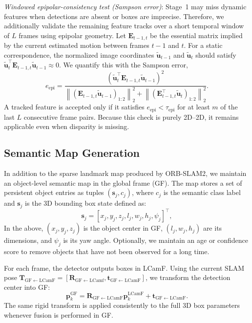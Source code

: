 \documentclass[letterpaper, 10 pt, conference]{IEEEtran}  %
\begin{document}
 {\it Windowed epipolar-consistency test (Sampson error)}:
Stage~1 may miss dynamic features when detections are absent or boxes are imprecise. Therefore, we additionally validate the remaining feature tracks over a short temporal window of $L$ frames using epipolar geometry. Let $\mathbf{E}_{t-1,t}$ be the essential matrix implied by the current estimated motion between frames $t-1$ and $t$. For a static correspondence, the normalized image coordinates $\tilde{\mathbf{u}}_{t-1}$ and $\tilde{\mathbf{u}}_{t}$ should satisfy $\tilde{\mathbf{u}}_t^\top \mathbf{E}_{t-1,t}\tilde{\mathbf{u}}_{t-1}\approx 0$. We quantify this with the Sampson error,
\begin{equation}
e_{\mathrm{epi}}=
\frac{\left(\tilde{\mathbf{u}}_t^\top \mathbf{E}_{t-1,t}\tilde{\mathbf{u}}_{t-1}\right)^2}
{\left\|(\mathbf{E}_{t-1,t}\tilde{\mathbf{u}}_{t-1})_{1:2}\right\|_2^2+\left\|(\mathbf{E}_{t-1,t}^\top\tilde{\mathbf{u}}_t)_{1:2}\right\|_2^2}.
\label{eq:sampson}
\end{equation}
A tracked feature is accepted only if it satisfies $e_{\mathrm{epi}}<\tau_{\mathrm{epi}}$ for at least $m$ of the last $L$ consecutive frame pairs. Because this check is purely 2D--2D, it remains applicable even when disparity is missing.
\subsection{Semantic Map Generation}
In addition to the sparse landmark map produced by ORB-SLAM2, we maintain an object-level semantic map in the global frame (GF).
The map stores a set of persistent object entries as tuples $(\mathbf{s}_j, c_j)$, where $c_j$ is the semantic class label and $\mathbf{s}_j$ is the 3D bounding box state defined as:
\begin{equation}
\mathbf{s}_j=[x_j,y_j,z_j,l_j,w_j,h_j,\psi_j]^\top,
\label{eq:obj_state}
\end{equation}
In the above, $(x_j,y_j,z_j)$ is the object center in GF, $(l_j,w_j,h_j)$ are its dimensions, and $\psi_j$ is its yaw angle. Optionally, we maintain an age or confidence score to remove objects that have not been observed for a long time.

For each frame, the detector outputs boxes in LCamF. Using the current SLAM pose $\mathbf{T}_{\mathrm{GF}\leftarrow\mathrm{LCamF}}=[\mathbf{R}_{\mathrm{GF}\leftarrow\mathrm{LCamf}},\mathbf{t}_{\mathrm{GF}\leftarrow\mathrm{LCamF}}]$, we transform the detection center into GF:
\begin{equation}
\mathbf{p}^{\mathrm{GF}}_k=\mathbf{R}_{\mathrm{GF}\leftarrow\mathrm{LCamF}}\mathbf{p}^{\mathrm{LCamF}}_k+\mathbf{t}_{\mathrm{GF}\leftarrow\mathrm{LCamF}}.
\label{eq:tf_center}
\end{equation}
The same rigid transform is applied consistently to the full 3D box parameters whenever fusion is performed in GF.
\end{document}
